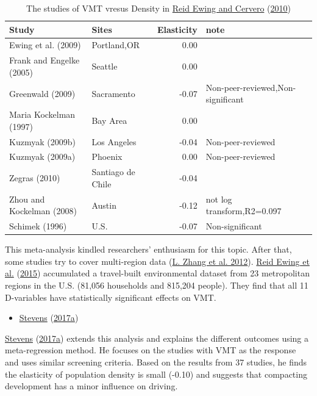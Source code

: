 \documentclass[
  12pt,
]{article}
\providecommand{\tightlist}{%
  \setlength{\itemsep}{0pt}\setlength{\parskip}{0pt}}
\begin{document}
\begin{table}

\caption{\label{tab:meta2010}The studies of VMT vresus Density in \protect\hyperlink{ref-ewingTravelBuiltEnvironment2010}{Reid Ewing and Cervero} (\protect\hyperlink{ref-ewingTravelBuiltEnvironment2010}{2010})}
\centering
\fontsize{9}{11}\selectfont
\begin{tabular}[t]{llrl}
\toprule
Study & Sites & Elasticity & note\\
\midrule
Ewing et al. (2009) & Portland,OR & 0.00 & \\
Frank and Engelke (2005) & Seattle & 0.00 & \\
Greenwald (2009) & Sacramento & -0.07 & Non-peer-reviewed,Non-significant\\
Maria Kockelman (1997) & Bay Area & 0.00 & \\
Kuzmyak (2009b) & Los Angeles & -0.04 & Non-peer-reviewed\\
\addlinespace
Kuzmyak (2009a) & Phoenix & 0.00 & Non-peer-reviewed\\
Zegras (2010) & Santiago de Chile & -0.04 & \\
Zhou and Kockelman (2008) & Austin & -0.12 & not log transform,R2=0.097\\
Schimek (1996) & U.S. & -0.07 & Non-significant\\
\bottomrule
\end{tabular}
\end{table}

This meta-analysis kindled researchers' enthusiasm for this topic. After that, some studies try to cover multi-region data (\protect\hyperlink{ref-zhangHowBuiltEnvironment2012}{L. Zhang et al. 2012}). \protect\hyperlink{ref-ewingVaryingInfluencesBuilt2015}{Reid Ewing et al.} (\protect\hyperlink{ref-ewingVaryingInfluencesBuilt2015}{2015}) accumulated a travel-built environmental dataset from 23 metropolitan regions in the U.S. (81,056 households and 815,204 people). They find that all 11 D-variables have statistically significant effects on VMT.

\begin{itemize}
\tightlist
\item
  \protect\hyperlink{ref-stevensDoesCompactDevelopment2017}{Stevens} (\protect\hyperlink{ref-stevensDoesCompactDevelopment2017}{2017a})
\end{itemize}

\protect\hyperlink{ref-stevensDoesCompactDevelopment2017}{Stevens} (\protect\hyperlink{ref-stevensDoesCompactDevelopment2017}{2017a}) extends this analysis and explains the different outcomes using a meta-regression method. He focuses on the studies with VMT as the response and uses similar screening criteria. Based on the results from 37 studies, he finds the elasticity of population density is small (-0.10) and suggests that compacting development has a minor influence on driving.
\end{document}
